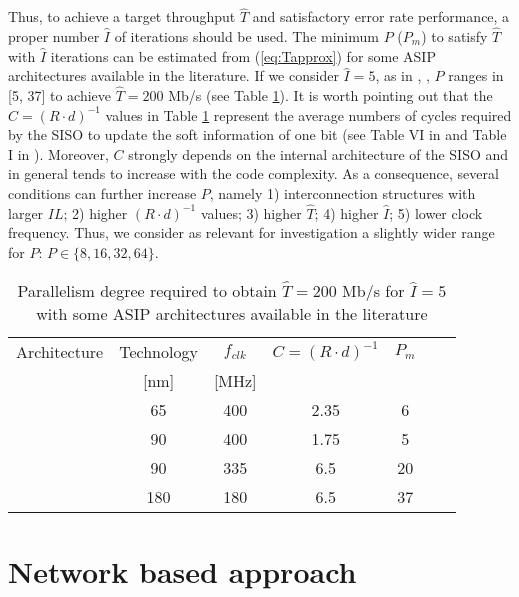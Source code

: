 \documentclass[10pt,twocolumn,journal]{IEEEtran}
\begin{document}
Thus, to achieve a target throughput $\hat{T}$ and satisfactory error rate performance, a proper number $\hat{I}$ of 
iterations should be used. 
The minimum $P$ ($P_m$) to satisfy $\hat{T}$ with $\hat{I}$ iterations can be estimated 
from (\ref{eq:Tapprox}) for some ASIP architectures available in the literature. 
If we consider $\hat{I}=5$, as in \cite{wehn_TVLSI08}, \cite{baghdadi_TVLSI09},
$P$ ranges in [5, 37] to achieve $\hat{T}=200$ Mb/s (see Table \ref{tab:PASIP}).
It is worth pointing out that the $C=(R\cdot d)^{-1}$ values in Table \ref{tab:PASIP} 
represent the average numbers of cycles required by the SISO to update the soft information of one bit 
(see Table VI in \cite{wehn_TVLSI08} and Table I in \cite{baghdadi_TVLSI09}).
Moreover, $C$ strongly depends on the internal architecture of the SISO and in general tends to 
increase with the code complexity.
As a consequence, several conditions can further increase $P$, namely 
1) interconnection structures with larger $IL$; 2) higher $(R \cdot d)^{-1}$ values; 
3) higher $\hat{T}$; 
4) higher $\hat{I}$; 
5) lower clock frequency.
Thus, we consider as relevant for investigation a slightly wider range for $P$: $P \in \{8, 16, 32, 64\}$.
\begin{table}[h!]
  \centering
\caption{Parallelism degree required to obtain $\hat{T}=200$ Mb/s for $\hat{I}=5$ with some ASIP architectures available in 
the literature}
  \label{tab:PASIP}
\begin{tabular}{|c|c|c|c|c|c|c|}
    \hline
Architecture       & Technology  & $f_{clk}$ & $C=(R\cdot d)^{-1}$ & $P_m$ \\
                        &  [nm]  & [MHz]     &        &       \\
    \hline 
\cite{wehn_TVLSI08}     & 65     & 400       & 2.35   & 6  \\
\cite{baghdadi_TVLSI09} & 90     & 400       & 1.75   & 5  \\
\cite{baghdadi_date06}  & 90     & 335       & 6.5    & 20 \\
\cite{baghdadi_date06}  & 180    & 180       & 6.5    & 37 \\
    \hline
  \end{tabular}
\end{table}

\section{Network based approach}
\label{sec:noc}
\end{document}
